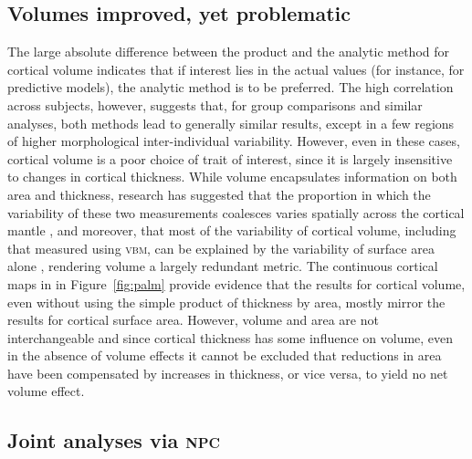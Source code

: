 \subsection{Volumes improved, yet problematic}

The large absolute difference between the product and the analytic method for cortical volume indicates that if interest lies in the actual values (for instance, for predictive models), the analytic method is to be preferred. The high correlation across subjects, however, suggests that, for group comparisons and similar analyses, both methods lead to generally similar results, except in a few regions of higher morphological inter-individual variability. However, even in these cases, cortical volume is a poor choice of trait of interest, since it is largely insensitive to changes in cortical thickness. While volume encapsulates information on both area and thickness, research has suggested that the proportion in which the variability of these two measurements coalesces varies spatially across the cortical mantle \citep{Winkler2010}, and moreover, that most of the variability of cortical volume, including that measured using \textsc{vbm}, can be explained by the variability of surface area alone \citep{Voets2008, Lenroot2009, Winkler2010, Rimol2012}, rendering volume a largely redundant metric. The continuous cortical maps in in Figure~\ref{fig:palm} provide evidence that the results for cortical volume, even without using the simple product of thickness by area, mostly mirror the results for cortical surface area. However, volume and area are not interchangeable and since cortical thickness has some influence on volume, even in the absence of volume effects it cannot be excluded that reductions in area have been compensated by increases in thickness, or vice versa, to yield no net volume effect.

\subsection{Joint analyses via \textsc{npc}}

